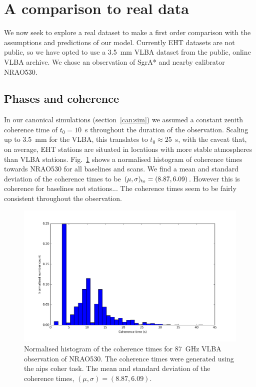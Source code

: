 \documentclass{article}
\begin{document}
 

\section{A comparison to real data}

We now seek to explore a real dataset to make a first order comparison with the assumptions and predictions of our model. Currently EHT datasets are not public, so we have opted to use a 3.5~mm VLBA dataset from the public, online VLBA archive. We chose an observation of SgrA* and nearby calibrator NRAO530. 

\subsection{Phases and coherence}

In our canonical simulations (section~\ref{can:sim}) we assumed a constant zenith coherence time of $t_0 = 10$~s throughout the duration of the observation.  Scaling up to 3.5~mm for the VLBA, this translates to $t_0 \approx 25$~s, with the caveat that, on average, EHT stations are situated in locations with more stable atmospheres than VLBA stations. Fig.~\ref{fig:coherence} shows a normalised histogram of coherence times towards NRAO530 for all baselines and scans. We find a mean and standard deviation of the coherence times to be $(\mu, \sigma)_{\rm t_0} = (8.87,6.09)$. However this is coherence for baselines not stations... The coherence times seem to be fairly consistent throughout the observation.

\begin{figure}[h]
\includegraphics[width=\columnwidth]{Images/Coherence_time_NRAO530ff}
\caption{Normalised histogram of the coherence times for 87~GHz VLBA observation of NRAO530. The coherence times were generated using the {\sc aips} {\sc coher} task. The mean and standard deviation of the coherence times, $(\mu, \sigma) = (8.87,6.09)$. \label{fig:coherence}%
}
\end{figure}
\end{document}
